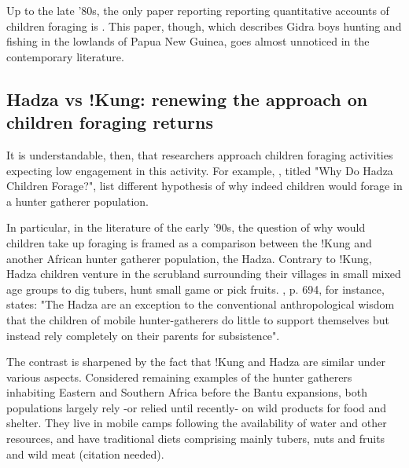 Up to the late '80s, the only paper reporting reporting quantitative accounts of children foraging is \cite{kawabe_development_1983}. This paper, though, which describes Gidra boys hunting and fishing in the lowlands of Papua New Guinea, goes almost unnoticed in the contemporary literature. 

\subsection{Hadza vs !Kung: renewing the approach on children foraging returns}

It is understandable, then, that researchers approach children foraging activities expecting low engagement in this activity. For example, \cite{blurton_jones_why_1997}, titled "Why Do Hadza Children Forage?", list different hypothesis of why indeed children would forage in a hunter gatherer population. 

In particular, in the literature of the early '90s, the question of why would children take up foraging is framed as a comparison between the !Kung and another African hunter gatherer population, the Hadza. Contrary to !Kung, Hadza children venture in the scrubland surrounding their villages in small mixed age groups to dig tubers, hunt small game or pick fruits.  \cite{hawkes_hadza_1995}, p. 694, for instance, states: "The Hadza are an exception to the conventional anthropological wisdom that the children of mobile hunter-gatherers do little to support themselves but instead rely completely on their parents for subsistence". 

The contrast is sharpened by the fact that !Kung and Hadza are similar under various aspects. Considered remaining examples of the hunter gatherers inhabiting Eastern and Southern Africa before the Bantu expansions, both populations largely rely -or relied until recently- on wild products for food and shelter. They live in mobile camps following the availability of water and other resources, and have traditional diets comprising mainly tubers, nuts and fruits and wild meat (citation needed).

